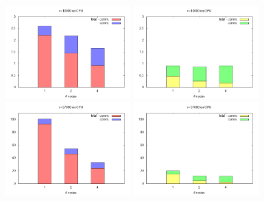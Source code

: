 \documentclass[12pt]{extarticle}
\begin{document}
\begin{figure}[H]
	\centering
	\includegraphics[width=0.43\textwidth]{plot_N10000_CPU.png} 
	\qquad
	\includegraphics[width=0.43\textwidth]{plot_N10000_GPU.png} 
	\qquad
	\includegraphics[width=0.43\textwidth]{plot_N37000_CPU.png} 
	\qquad
	\includegraphics[width=0.43\textwidth]{plot_N37000_GPU.png} 
\end{figure}





	
\end{document}

